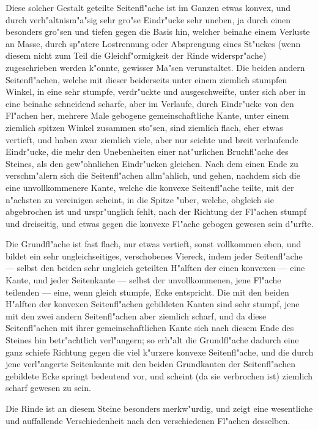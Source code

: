 \documentclass[a4paper, 11pt, oneside, german]{article}
\begin{document}
Diese solcher Gestalt geteilte Seitenfl"ache ist im Ganzen etwas konvex, und durch verh"altnism"a"sig sehr gro"se Eindr"ucke sehr uneben, ja durch einen besonders gro"sen und tiefen gegen die Basis hin, welcher beinahe einem Verluste an Masse, durch sp"atere Lostrennung oder Absprengung eines St"uckes (wenn diesem nicht zum Teil die Gleichf"ormigkeit der Rinde widerspr"ache) zugeschrieben werden k"onnte, gewisser Ma"sen verunstaltet. Die beiden andern Seitenfl"achen, welche mit dieser beiderseits unter einem ziemlich stumpfen Winkel, in eine sehr stumpfe, verdr"uckte und ausgeschweifte, unter sich aber in eine beinahe schneidend scharfe, aber im Verlaufe, durch Eindr"ucke von den Fl"achen her, mehrere Male gebogene gemeinschaftliche Kante, unter einem ziemlich spitzen Winkel zusammen sto"sen, sind ziemlich flach, eher etwas vertieft, und haben zwar ziemlich viele, aber nur seichte und breit verlaufende Eindr"ucke, die mehr den Unebenheiten einer nat"urlichen Bruchfl"ache des Steines, als den gew"ohnlichen Eindr"ucken gleichen. Nach dem einen Ende zu verschm"alern sich die Seitenfl"achen allm"ahlich, und gehen, nachdem sich die eine unvollkommenere Kante, welche die konvexe Seitenfl"ache teilte, mit der n"achsten zu vereinigen scheint, in die Spitze "uber, welche, obgleich sie abgebrochen ist und urspr"unglich fehlt, nach der Richtung der Fl"achen stumpf und dreiseitig, und etwas gegen die konvexe Fl"ache gebogen gewesen sein d"urfte.

Die Grundfl"ache ist fast flach, nur etwas vertieft, sonst vollkommen eben, und bildet ein sehr ungleichseitiges, verschobenes Viereck, indem jeder Seitenfl"ache --- selbst den beiden sehr ungleich geteilten H"alften der einen konvexen --- eine Kante, und jeder Seitenkante --- selbst der unvollkommenen, jene Fl"ache teilenden --- eine, wenn gleich stumpfe, Ecke entspricht. Die mit den beiden H"alften der konvexen Seitenfl"achen gebildeten Kanten sind sehr stumpf, jene mit den zwei andern Seitenfl"achen aber ziemlich scharf, und da diese Seitenfl"achen mit ihrer gemeinschaftlichen Kante sich nach diesem Ende des Steines hin betr"achtlich verl"angern; so erh"alt die Grundfl"ache dadurch eine ganz schiefe Richtung gegen die viel k"urzere konvexe Seitenfl"ache, und die durch jene verl"angerte Seitenkante mit den beiden Grundkanten der Seitenfl"achen gebildete Ecke springt bedeutend vor, und scheint (da sie verbrochen ist) ziemlich scharf gewesen zu sein.

Die Rinde ist an diesem Steine besonders merkw"urdig, und zeigt eine wesentliche und auffallende Verschiedenheit nach den verschiedenen Fl"achen desselben.
\end{document}

